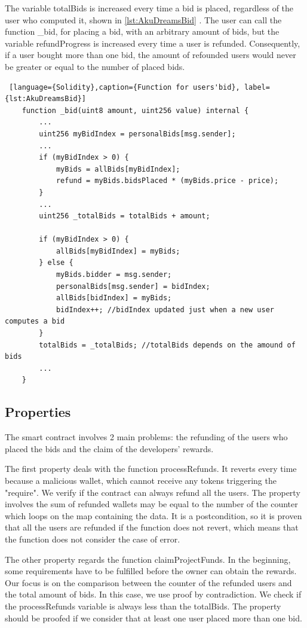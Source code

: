 The variable totalBids is increased every time a bid is placed, regardless of the user who computed it, shown in \autoref{lst:AkuDreamsBid} .
The user can call the function \_bid, for placing a bid, with an arbitrary amount of bids, but the variable refundProgress is increased every time a user is refunded. 
Consequently, if a user bought more than one bid, the amount of refounded users would never be greater or equal to the number of placed bids.
\begin{lstlisting} [language={Solidity},caption={Function for users'bid}, label={lst:AkuDreamsBid}]
    function _bid(uint8 amount, uint256 value) internal {
        ...
        uint256 myBidIndex = personalBids[msg.sender];
        ...
        if (myBidIndex > 0) {
            myBids = allBids[myBidIndex];
            refund = myBids.bidsPlaced * (myBids.price - price);
        }
        ...
        uint256 _totalBids = totalBids + amount;

        if (myBidIndex > 0) {
            allBids[myBidIndex] = myBids;
        } else {
            myBids.bidder = msg.sender;
            personalBids[msg.sender] = bidIndex;
            allBids[bidIndex] = myBids;
            bidIndex++; //bidIndex updated just when a new user computes a bid
        }
        totalBids = _totalBids; //totalBids depends on the amound of bids
        ...
    }
\end{lstlisting}

\subsection{Properties}
The smart contract involves 2 main problems: the refunding of the users who placed the bids and the claim of the developers' rewards.

The first property deals with the function processRefunds. 
It reverts every time because a malicious wallet, which cannot receive 
any tokens triggering the "require". 
We verify if the contract can always refund all the users.
The property involves the sum of refunded wallets may be equal to the number of the counter which loops on the map containing the data. 
It is a postcondition, so it is proven that all the users are refunded if the function does not revert, which means that the function does not 
consider the case of error.

The other property regards the function claimProjectFunds. 
In the beginning, some requirements have to be fulfilled before the owner can obtain the rewards.
Our focus is on the comparison between the counter of the refunded users and the total amount of bids.
In this case, we use proof by contradiction. We check if the processRefunds variable is always less than the totalBids. 
The property should be proofed if we consider that at least one user placed more than one bid.

